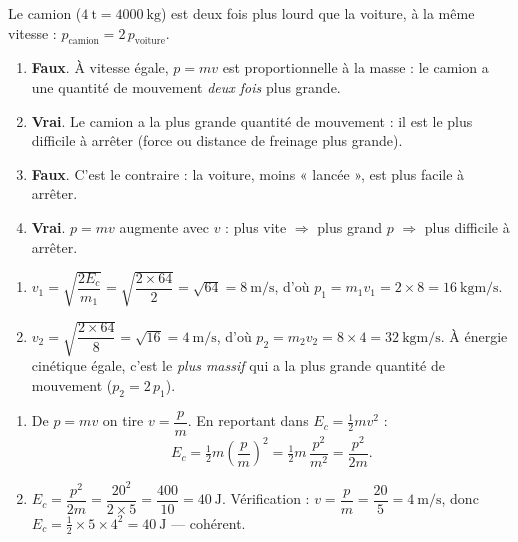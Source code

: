 \documentclass[11pt,a4paper]{article}
\begin{document}

\begin{corrige}
Le camion ($\qty{4}{\tonne}=\qty{4000}{\kilogram}$) est deux fois plus lourd que la voiture, à la même
vitesse : $p_{\text{camion}}=2\,p_{\text{voiture}}$.
\begin{enumerate}[label=\alph*)]
  \item \textbf{Faux}. À vitesse égale, $p=mv$ est proportionnelle à la masse : le camion a une
        quantité de mouvement \emph{deux fois} plus grande.
  \item \textbf{Vrai}. Le camion a la plus grande quantité de mouvement : il est le plus difficile à
        arrêter (force ou distance de freinage plus grande).
  \item \textbf{Faux}. C'est le contraire : la voiture, moins « lancée », est plus facile à arrêter.
  \item \textbf{Vrai}. $p=mv$ augmente avec $v$ : plus vite $\Rightarrow$ plus grand $p$ $\Rightarrow$
        plus difficile à arrêter.
\end{enumerate}
\end{corrige}

\begin{corrige}
\begin{enumerate}[label=\alph*)]
  \item $v_1=\sqrt{\dfrac{2E_c}{m_1}}=\sqrt{\dfrac{2\times64}{2}}=\sqrt{64}=\qty{8}{\metre\per\second}$,
        d'où $p_1=m_1 v_1=2\times8=\qty{16}{\kilogram\metre\per\second}$.
  \item $v_2=\sqrt{\dfrac{2\times64}{8}}=\sqrt{16}=\qty{4}{\metre\per\second}$, d'où
        $p_2=m_2 v_2=8\times4=\qty{32}{\kilogram\metre\per\second}$. À énergie cinétique égale, c'est le
        \emph{plus massif} qui a la plus grande quantité de mouvement ($p_2=2\,p_1$).
\end{enumerate}
\end{corrige}

\begin{corrige}
\begin{enumerate}[label=\alph*)]
  \item De $p=mv$ on tire $v=\dfrac{p}{m}$. En reportant dans $E_c=\tfrac12 m v^2$ :
        \[
        E_c=\tfrac12 m\left(\frac{p}{m}\right)^2=\tfrac12 m\,\frac{p^2}{m^2}=\frac{p^2}{2m}.
        \]
  \item $E_c=\dfrac{p^2}{2m}=\dfrac{20^2}{2\times5}=\dfrac{400}{10}=\qty{40}{\joule}$.
        Vérification : $v=\dfrac{p}{m}=\dfrac{20}{5}=\qty{4}{\metre\per\second}$, donc
        $E_c=\tfrac12\times5\times4^2=\qty{40}{\joule}$ — cohérent.
\end{enumerate}
\end{corrige}
\end{document}
